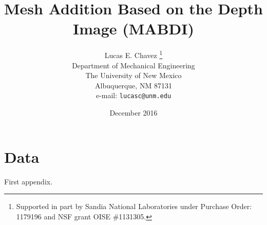 \documentclass{eeceTR}
\date{December 2016}
\title{Mesh Addition Based on the Depth Image (MABDI)}
\author{Lucas E. Chavez \thanks{Supported in part by Sandia National
Laboratories under Purchase Order: 1179196 and  NSF grant OISE \#1131305.}\\
Department of Mechanical Engineering\\
The University of New Mexico\\
Albuquerque, NM 87131\\
e-mail: {\tt lucasc@unm.edu}
}
\begin{document}
\maketitle
\makeabstract

\tableofcontents
\pagebreak














\appendix

\section{Data}
First appendix.



\end{document}
